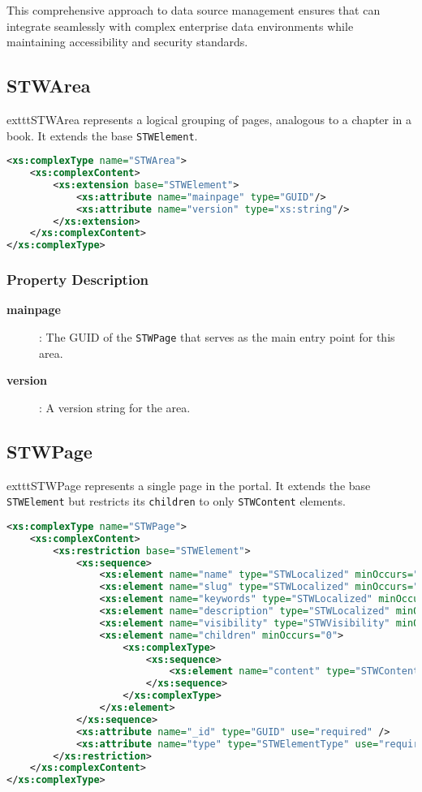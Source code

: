 This comprehensive approach to data source management ensures that \wbdl{} can integrate seamlessly with complex enterprise data environments while maintaining accessibility and security standards.

\subsection{STWArea}

	exttt{STWArea} represents a logical grouping of pages, analogous to a chapter in a book. It extends the base \texttt{STWElement}.

\begin{lstlisting}[language=XML,caption={STWArea Type Definition}]
<xs:complexType name="STWArea">
	<xs:complexContent>
		<xs:extension base="STWElement">
			<xs:attribute name="mainpage" type="GUID"/>
			<xs:attribute name="version" type="xs:string"/>
		</xs:extension>
	</xs:complexContent>
</xs:complexType>
\end{lstlisting}

\subsubsection{Property Description}

\begin{description}
\item[\textbf{mainpage}]: The GUID of the \texttt{STWPage} that serves as the main entry point for this area.
\item[\textbf{version}]: A version string for the area.
\end{description}

\subsection{STWPage}

	exttt{STWPage} represents a single page in the portal. It extends the base \texttt{STWElement} but restricts its \texttt{children} to only \texttt{STWContent} elements.

\begin{lstlisting}[language=XML,caption={STWPage Type Definition}]
<xs:complexType name="STWPage">
	<xs:complexContent>
		<xs:restriction base="STWElement">
			<xs:sequence>
				<xs:element name="name" type="STWLocalized" minOccurs="1" />
				<xs:element name="slug" type="STWLocalized" minOccurs="1" />
				<xs:element name="keywords" type="STWLocalized" minOccurs="0" />
				<xs:element name="description" type="STWLocalized" minOccurs="0" />
				<xs:element name="visibility" type="STWVisibility" minOccurs="0" />
				<xs:element name="children" minOccurs="0">
					<xs:complexType>
						<xs:sequence>
							<xs:element name="content" type="STWContent" minOccurs="0" maxOccurs="unbounded"/>
						</xs:sequence>
					</xs:complexType>
				</xs:element>
			</xs:sequence>
			<xs:attribute name="_id" type="GUID" use="required" />
			<xs:attribute name="type" type="STWElementType" use="required" />
		</xs:restriction>
	</xs:complexContent>
</xs:complexType>
\end{lstlisting}

